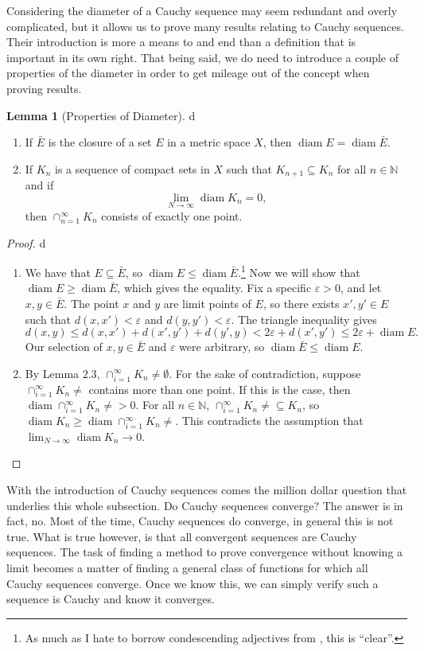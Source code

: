 \documentclass{article}
\newcommand{\N}{\mathbb{N}}
\DeclareMathOperator{\diam}{diam}
\theoremstyle{definition}
\newtheorem{lemma}{Lemma}[section]
\begin{document}
	Considering the diameter of a Cauchy sequence may seem redundant and overly complicated, but it allows us to prove many results relating to Cauchy sequences. Their introduction is more a means to and end than a definition that is important in its own right. That being said, we do need to introduce a couple of properties of the diameter in order to get mileage out of the concept when proving results.
	\begin{lemma}[Properties of Diameter]
		{\color{white}d}
		\begin{enumerate}
			\item If $ \bar{E} $ is the closure of a set $ E $ in a metric space $ X $, then $\diam E=\diam \bar{E} $.
			\item If $ K_n $ is a sequence of compact sets in $ X $ such that $ K_{n+1}\subseteq K_n $ for all $ n\in\N $ and if $$\lim_{N\to\infty}\diam K_n=0, $$ then $ \cap_{n=1}^\infty K_n $ consists of exactly one point. 
		\end{enumerate}
	\end{lemma}
	\begin{proof}	{\color{white}d}
		\begin{enumerate}
			\item We have that $ E\subseteq \bar{E} $, so $ \diam E\le \diam \bar{E} $.\footnote{As much as I hate to borrow condescending adjectives from \cite{rudin1964principles}, this is ``clear''.} Now we will show that $ \diam E\ge\diam\bar{E} $, which gives the equality. Fix a specific $ \varepsilon>0 $, and let $ x,y\in\bar{E} $. The point $ x $ and $y$ are limit points of $ E $, so there exists $ x',y'\in E $ such that $ d(x,x')<\varepsilon $ and $ d(y,y')<\varepsilon $. The triangle inequality gives $$ d(x,y)\le d(x,x')+d(x',y')+d(y',y)<2\varepsilon+d(x',y')\le 2\varepsilon+\diam E.$$ Our selection of $ x,y\in\bar{E} $ and $ \varepsilon $ were arbitrary, so $ \diam\bar{E}\le \diam E $. 
			\item By Lemma $ 2.3 $, $ \cap_{i=1}^\infty K_n\neq\emptyset $. For the sake of contradiction, suppose $ \cap_{i=1}^\infty K_n\neq $ contains more than one point. If this is the case, then $ \diam \cap_{i=1}^\infty K_n\neq>0 $. For all $n\in\N $, $ \cap_{i=1}^\infty K_n\neq\subseteq K_n $, so $ \diam K_n\ge\diam \cap_{i=1}^\infty K_n\neq $. This contradicts the assumption that $ \lim_{N\to\infty}\diam K_n\to 0 $. 
		\end{enumerate}
	\end{proof}
	With the introduction of Cauchy sequences comes the million dollar question that underlies this whole subsection. Do Cauchy sequences converge? The answer is in fact, no. Most of the time, Cauchy sequences do converge, in general this is not true. What is true however, is that all convergent sequences are Cauchy sequences. The task of finding a method to prove convergence without knowing a limit becomes a matter of finding a general class of functions for which all Cauchy sequences converge. Once we know this, we can simply verify such a sequence is Cauchy and know it converges. 
\end{document}
